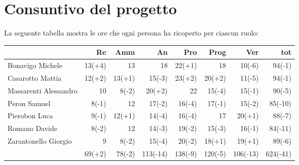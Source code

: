 \section{Consuntivo del progetto}

La seguente tabella mostra le ore che ogni persona ha ricoperto per ciascun ruolo:
\begin{table}[H]
    \begin{tabularx}{\linewidth}{X|rrrrrrr}
    \rowcolor{gray!30}& Re & Amm & An & Pro & Prog & Ver & tot \\
    \hline
    Bonavigo Michele                        & 13(+4)    & 13         & 18       & 22(+1)   & 18       & 10(-6)   & 94(-1) \\

    \rowcolor{gray!10}Casarotto Mattia      & 12(+2)    & 13(+1)     & 15(-3)   & 23(+2)   & 20(+2)   & 11(-5)   & 94(-1)\\

    Massarenti Alessandro                   & 10         & 8(-2)     & 20(+2)   & 22       & 15(-4)   & 15(-1)   & 90(-5) \\

    \rowcolor{gray!10}Peron Samuel          & 8(-1)     & 12         & 17(-2)   & 16(-4)   & 17(-1)   & 15(-2)   & 85(-10)\\ 

    Pierobon Luca                           & 9(-1)     & 12(+1)     & 14(-4)   & 16(-4)   & 17       & 20(+1)   & 88(-7)\\ 
 
    \rowcolor{gray!10}Romano Davide         & 8(-2)     & 12         & 14(-3)   & 19(-2)   & 15(-3)   & 16(-1)   & 84(-11)\\ 
 
    Zarantonello Giorgio                    & 9         & 8(-2)      & 15(-4)   & 20(-2)   & 18(+1)   & 19(+1)   & 89(-6)\\ 

    \hline                                  & 69(+2)    & 78(-2)    & 113(-14)  & 138(-9)  & 120(-5)  & 106(-13) & 624(-41) \\  
    \end{tabularx}
\end{table} 


